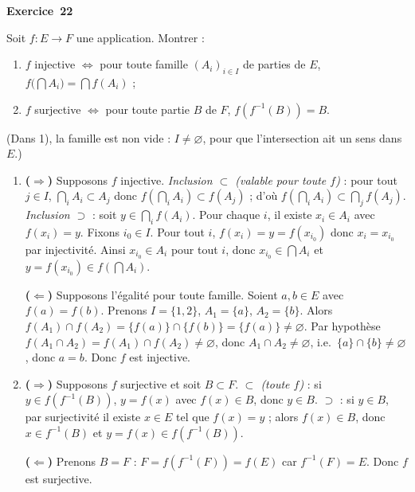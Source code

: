 \documentclass[11pt,a4paper]{article}
\begin{document}
	\medskip\noindent\textbf{\Large\color{bleu}Exercice~22}\nopagebreak
	\begin{enonce}
		Soit $f:E\to F$ une application. Montrer  :
		\begin{enumerate}
			\item $f$ injective $\iff$ pour toute famille $(A_i)_{i\in I}$ de parties de $E$,
			$f\bigl(\bigcap A_i\bigr)=\bigcap f(A_i)$ ;
			\item $f$ surjective $\iff$ pour toute partie $B$ de $F$, $f(f^{-1}(B))=B$.
		\end{enumerate}
	\end{enonce}
	\begin{corrige}
		(Dans 1), la famille est non vide : $I\neq\varnothing$, pour que l'intersection ait un sens dans $E$.)
		\begin{enumerate}
			\item \textbf{($\Rightarrow$)} Supposons $f$ injective. \emph{Inclusion $\subset$ (valable pour toute $f$)} : pour tout $j\in I$, $\bigcap_iA_i\subset A_j$ donc $f(\bigcap_iA_i)\subset f(A_j)$ ; d'où $f(\bigcap_iA_i)\subset\bigcap_jf(A_j)$. \emph{Inclusion $\supset$} : soit $y\in\bigcap_if(A_i)$. Pour chaque $i$, il existe $x_i\in A_i$ avec $f(x_i)=y$. Fixons $i_0\in I$. Pour tout $i$, $f(x_i)=y=f(x_{i_0})$ donc $x_i=x_{i_0}$ par injectivité. Ainsi $x_{i_0}\in A_i$ pour tout $i$, donc $x_{i_0}\in\bigcap A_i$ et $y=f(x_{i_0})\in f(\bigcap A_i)$.
			
			\textbf{($\Leftarrow$)} Supposons l'égalité pour toute famille. Soient $a,b\in E$ avec $f(a)=f(b)$. Prenons $I=\{1,2\}$, $A_1=\{a\}$, $A_2=\{b\}$. Alors $f(A_1)\cap f(A_2)=\{f(a)\}\cap\{f(b)\}=\{f(a)\}\neq\varnothing$. Par hypothèse $f(A_1\cap A_2)=f(A_1)\cap f(A_2)\neq\varnothing$, donc $A_1\cap A_2\neq\varnothing$, i.e.\ $\{a\}\cap\{b\}\neq\varnothing$, donc $a=b$. Donc $f$ est injective.
			\item \textbf{($\Rightarrow$)} Supposons $f$ surjective et soit $B\subset F$. \emph{$\subset$ (toute $f$)} : si $y\in f(f^{-1}(B))$, $y=f(x)$ avec $f(x)\in B$, donc $y\in B$. \emph{$\supset$} : si $y\in B$, par surjectivité il existe $x\in E$ tel que $f(x)=y$ ; alors $f(x)\in B$, donc $x\in f^{-1}(B)$ et $y=f(x)\in f(f^{-1}(B))$.
			
			\textbf{($\Leftarrow$)} Prenons $B=F$ : $F=f(f^{-1}(F))=f(E)$ car $f^{-1}(F)=E$. Donc $f$ est surjective.
		\end{enumerate}
	\end{corrige}
	
\end{document}
